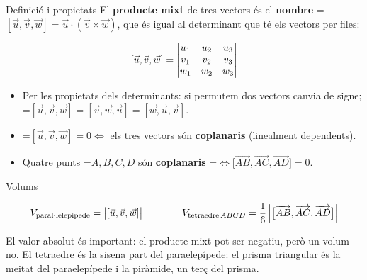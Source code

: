 \documentclass[11pt,a4paper]{article}
\newcommand{\fmm}[1]{\setbox0=\hbox{$#1$}\ifdim\wd0>\linewidth\fmdisp{#1}\else\mbox{\box0}\fi}
\newcommand{\fmdisp}[1]{\[\setbox2=\hbox{$\displaystyle #1$}\ifdim\wd2>\linewidth\resizebox{\linewidth}{!}{\box2}\else\box2\fi\]}
\begin{document}
\begin{fmdef}{Definició i propietats}
El \textbf{producte mixt} de tres vectors és el \textbf{nombre} \fmm{[\vec u,\vec v,\vec w]=\vec u\cdot(\vec v\times\vec w)}, que és igual al determinant que té els vectors per files:

\fmdisp{[\vec u,\vec v,\vec w]=\begin{vmatrix}u_1&u_2&u_3\\v_1&v_2&v_3\\w_1&w_2&w_3\end{vmatrix}}
\newpage
\begin{itemize}
\item Per les propietats dels determinants: si permutem dos vectors canvia de signe; \fmm{[\vec u,\vec v,\vec w]=[\vec v,\vec w,\vec u]=[\vec w,\vec u,\vec v]}.
\item \fmm{[\vec u,\vec v,\vec w]=0\iff} els tres vectors són \textbf{coplanaris} (linealment dependents).
\item Quatre punts \fmm{A,B,C,D} són \textbf{coplanaris} \fmm{\iff\big[\overrightarrow{AB},\overrightarrow{AC},\overrightarrow{AD}\big]=0}.
\end{itemize}
\end{fmdef}

\begin{fmprop}{Volums}

\fmdisp{V_{\text{paral}{\cdotp}\text{lelepípede}}=\big|[\vec u,\vec v,\vec w]\big|\qquad\qquad V_{\text{tetraedre}\,ABCD}=\dfrac16\,\Big|\big[\overrightarrow{AB},\overrightarrow{AC},\overrightarrow{AD}\big]\Big|}

El valor absolut és important: el producte mixt pot ser negatiu, però un volum no. El tetraedre és la sisena part del para\lgem{}elepípede: el prisma triangular és la meitat del para\lgem{}elepípede i la piràmide, un terç del prisma.
\end{fmprop}
\end{document}
